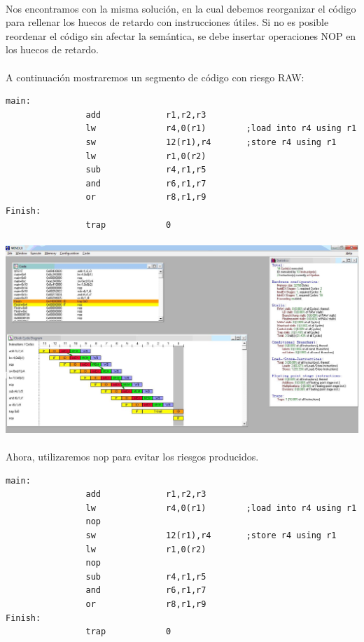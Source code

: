 \documentclass[a4paper,11pt]{article}
\begin{document}
\begin{enumerate}
\paragraph{}
Nos encontramos con la misma soluci\'on, en la cual debemos reorganizar el c\'odigo para rellenar los huecos de retardo con instrucciones \'utiles.
Si no es posible reordenar el c\'odigo sin afectar la sem\'antica, se debe insertar operaciones NOP en los huecos de retardo.

\paragraph{}
A continuaci\'on mostraremos un segmento de c\'odigo con riesgo RAW:


\begin{center}
\begin{verbatim}
main:
                add             r1,r2,r3
                lw              r4,0(r1)        ;load into r4 using r1
                sw              12(r1),r4       ;store r4 using r1
                lw              r1,0(r2)
                sub             r4,r1,r5
                and             r6,r1,r7
                or              r8,r1,r9
Finish:       
                trap            0
\end{verbatim}
\end{center}

\paragraph{}
\centering
\includegraphics[width=400pt]{punto5-1.JPG}


\paragraph{}
Ahora, utilizaremos nop para evitar los riesgos producidos.
\begin{center}
\begin{verbatim}
main:
                add             r1,r2,r3
                lw              r4,0(r1)        ;load into r4 using r1
				nop
                sw              12(r1),r4       ;store r4 using r1
                lw              r1,0(r2)
				nop
                sub             r4,r1,r5
                and             r6,r1,r7
                or              r8,r1,r9
Finish:       
                trap            0
\end{verbatim}
\end{center}


\end{enumerate}
\end{document}
